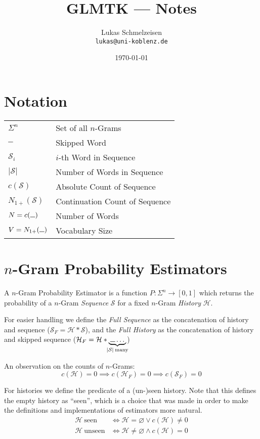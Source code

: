 \documentclass[11pt,a4paper]{article}
\title{GLMTK --- Notes}
\author{Lukas Schmelzeisen \\ \texttt{lukas@uni-koblenz.de}}
\date{\today}
\newcommand{\Seq}{\mathcal{S}}
\newcommand{\Hist}{\mathcal{H}}
\newcommand{\SeqF}{\mathcal{S}_F}
\newcommand{\HistF}{\mathcal{H}_F}
\newcommand{\Skp}{\rule{7pt}{.5pt}}
\begin{document}
  \maketitle
  \tableofcontents
  \clearpage

  \section{Notation}

  \begin{tabular}{ l l }
    $\Sigma^n$  & Set of all $n$-Grams \\
    $\Skp$ & Skipped Word \\
    $\Seq_i$ & $i$-th Word in Sequence \\
    $|\Seq|$ & Number of Words in Sequence \\
    $c(\Seq)$ & Absolute Count of Sequence \\
    $N_{1+}(\Seq)$ & Continuation Count of Sequence \\
    $N = c(\Skp)$ & Number of Words \\
    $V = N_{1+}(\Skp)$ & Vocabulary Size \\
  \end{tabular}

  \section{$n$-Gram Probability Estimators}

  A $n$-Gram Probability Estimator is a function $P :\Sigma^n \to [0,1]$ which
  returns the probability of a $n$-Gram \emph{Sequence} $\Seq$ for a fixed
  $n$-Gram \emph{History} $\Hist$.

  For easier handling we define the \emph{Full Sequence} as the concatenation
  of history and sequence ($\SeqF = \Hist * \Seq$), and the \emph{Full History}
  as the concatenation of history and skipped sequence
  ($\HistF = \Hist * \underbrace{\: \Skp \dotso \:}_{\mathclap{|\Seq| \: \text{many}}}$)

  An observation on the counts of $n$-Grams:
  \begin{equation}
    c(\Hist) = 0 \implies c(\HistF) = 0 \implies c(\SeqF) = 0
  \end{equation}

  For histories we define the predicate of a (un-)seen history. Note that this
  defines the empty history as ``seen'', which is a choice that was made in
  order to make the definitions and implementations of estimators more natural.
  \begin{equation}
    \begin{aligned}
      \Hist \: \mathrm{seen} &\iff \Hist = \varnothing \lor c(\Hist) \neq 0 \\
      \Hist \: \mathrm{unseen} &\iff \Hist \neq \varnothing \land c(\Hist) = 0
    \end{aligned}
  \end{equation}
\end{document}
